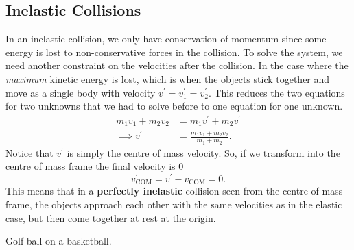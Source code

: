 \documentclass[../classical_mechanics.tex]{subfiles}
\begin{document}
        \subsection{Inelastic Collisions}\label{subsec:inelastic-collisions}
            In an inelastic collision, we only have conservation of momentum since some energy is lost to non-conservative forces in the collision.
            To solve the system, we need another constraint on the velocities after the collision.
            In the case where the \textit{maximum} kinetic energy is lost, which is when the objects stick together and move as a single body with velocity $v^\prime=v_1^\prime=v_2^\prime$.
            This reduces the two equations for two unknowns that we had to solve before to one equation for one unknown.
            \begin{align}
                m_1v_1+m_2v_2&=m_1v^\prime+m_2v^\prime\\
                \implies v^\prime&=\frac{m_1v_1+m_2v_2}{m_1+m_2}.
            \end{align}
            Notice that $v^\prime$ is simply the centre of mass velocity.
            So, if we transform into the centre of mass frame the final velocity is 0
            \begin{equation}
                v_\text{COM}^\prime=v^\prime-v_\text{COM}=0.
            \end{equation}
            This means that in a \textbf{perfectly inelastic} collision seen from the centre of mass frame, the objects approach each other with the same velocities as in the elastic case, but then come together at rest at the origin.
            \begin{example}
                Golf ball on a basketball.
            \end{example}
\end{document}
